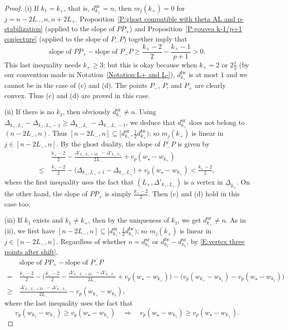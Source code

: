 \documentclass[12pt]{amsart}
\theoremstyle{definition}
\numberwithin{equation}{subsection}
\newcommand{\Iw}{\mathrm{Iw}}
\newcommand{\unr}{\mathrm{ur}}
\newcommand{\ur}{\mathrm{ur}}
\begin{document}
\begin{proof}
(i)
If $k_1=k_+$, that is, $d_{k_+}^\unr = n$, then $m_j(k_+) = 0$ for $j = n-2L_-, n, n+2L_+$.
Proposition~\ref{P:ghost compatible with theta AL and p-stabilization} (applied to the slope of $\overline{PP_+}$) and Proposition~\ref{P:gouvea k-1/p+1 conjecture} (applied to the slope of $\overline{P_-P}$) together imply that
\[
\textrm{slope of }\overline{PP_+}  - \textrm{slope of }\overline{P_-P} \geq \frac {k_+-2}{2} -  \frac{k_+-1}{p+1}>0.
\]
This last inequality needs $k_+ \geq 3$; but this is okay because when $k_+ = 2 $ or $ 2\frac 12$ (by our convention made in Notation~\ref{Notation:L+ and L-}), $d_{k_+}^\Iw$ is at most $1$ and we cannot be in the case of (c) and (d).
The points $P_-$, $P$, and $P_+$ are clearly convex. Thus (c) and (d) are proved in this case.

(ii) If there is no $k_1$, then obviously $d_{k_+}^\unr\neq n$. Using $\Delta_{k_+, L_+} - \Delta_{k_+, L_+-1} \geq \Delta_{k_-, L_-} - \Delta_{k_-, L_--1}$, we deduce that $d_{k_+}^\unr$ does not belong to $(n-2L_-, n)$. Thus $[n-2L_-, n]\subseteq [d_{k_+}^\unr, \tfrac 12 d_{k_+}^\Iw)$; so $m_j(k_+)$ is linear in $j \in [n-2L_-,n]$. By the ghost duality, the slope of $\overline{P_-P}$ is given by
\begin{align*}
&\frac{k_+-2}2  -\frac{ \Delta'_{k_+, L_++2L_-} - \Delta'_{k_+, L_+}}{2L_-} + v_p(w_\star- w_{k_+}) 
\\
\leq\ & \frac{k_+-2}2 - \big(\Delta_{k_+, L_++1}- \Delta_{k_+, L_+}\big) + v_p(w_\star - w_{k_+}) < \frac{k_+-2}2,
\end{align*}
where the first inequality uses the fact that $(L_+, \Delta'_{k_+, L_+})$ is a vertex in $\underline \Delta_{k_+}$. On the other hand, the slope of $\overline{PP_+}$ is simply $\frac{k_+-2}2$. Then (c) and (d) hold in this case too.

(iii) If $k_1$ exists and $k_1 \neq k_+$, then by the uniqueness of $k_1$, we get $d_{k_+}^\unr\neq n$. As in (ii), we first have $[n-2L_-, n]\subseteq [d_{k_+}^\unr, \tfrac 12 d_{k_+}^\Iw)$; so $m_j(k_+)$ is linear in $j \in [n-2L_-,n]$. 
Regardless of whether  $n=d_{k_1}^{\unr}$ or $d_{k_1}^\Iw-d_{k_1}^\ur$,  by \eqref{E:vertex three points after shift},
\begin{align*}
&\textrm{slope of }\overline{PP_+}  - \textrm{slope of }\overline{P_-P}
\\
=\ & \frac{k_+-2}2 - \Big( \frac{k_+-2}2  -\frac{\Delta'_{k_+, L_++2L_-} - \Delta'_{k_+, L_+}}{2L_-} +v_p(w_\star-w_{k_+})\Big) - \big(v_p(w_{k_+}-w_{k_1})- v_p(w_\star-w_{k_1})  \big)
\\
\geq \ &\frac{\Delta'_{k_+, L_++2L_-} - \Delta'_{k_+, L_+}}{2L_-} - v_p(w_{k_+}-w_{k_1}),
\end{align*}
where the last inequality uses the fact that $$v_p(w_{k_1} - w_{k_+}) \geq  v_p(w_\star-w_{k_+})\quad \Rightarrow \quad v_p(w_\star - w_{k_1}) \geq  v_p(w_\star-w_{k_+}).$$


\end{proof}
\end{document}

